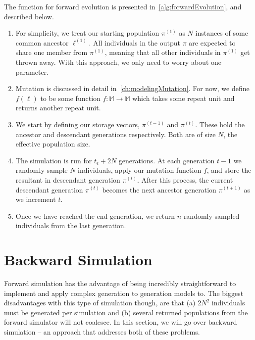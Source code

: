 The function for forward evolution is presented in~\autoref{alg:forwardEvolution}, and described below.
\begin{enumerate}
    \item For simplicity, we treat our starting population $\pi^{(1)}$ as $N$ instances of some common ancestor
        $\ell^{(1)}$.
        All individuals in the output $\pi$ are expected to share one member from $\pi^{(1)}$, meaning that all other
        individuals in $\pi^{(1)}$ get thrown away.
        With this approach, we only need to worry about one parameter.
    \item Mutation is discussed in detail in~\autoref{ch:modelingMutation}.
        For now, we define $f(\ell)$ to be some function $f : \mathbb{M} \rightarrow \mathbb{M}$ which
        takes some repeat unit and returns another repeat unit.
    \item We start by defining our storage vectors, $\pi^{(t-1)}$ and $\pi^{(t)}$.
        These hold the ancestor and descendant generations respectively.
        Both are of size $N$, the effective population size.
    \item The simulation is run for $t_\epsilon + 2N$ generations.
        At each generation $t - 1$ we randomly sample $N$ individuals, apply our mutation function $f$, and store the
        resultant in descendant generation $\pi^{(t)}$.
        After this process, the current descendant generation $\pi^{(t)}$ becomes the next ancestor generation
        $\pi^{(t+1)}$ as we increment $t$.
    \item Once we have reached the end generation, we return $n$ randomly sampled individuals from the last generation.
\end{enumerate}


\section{Backward Simulation}\label{sec:backwardSimulation}
Forward simulation has the advantage of being incredibly straightforward to implement and apply complex generation to
generation models to.
The biggest disadvantages with this type of simulation though, are that (a) $2N^2$ individuals must
be generated per simulation and (b) several returned populations from the forward simulator will not coalesce.
In this section, we will go over backward simulation -- an approach that addresses both of these problems.

